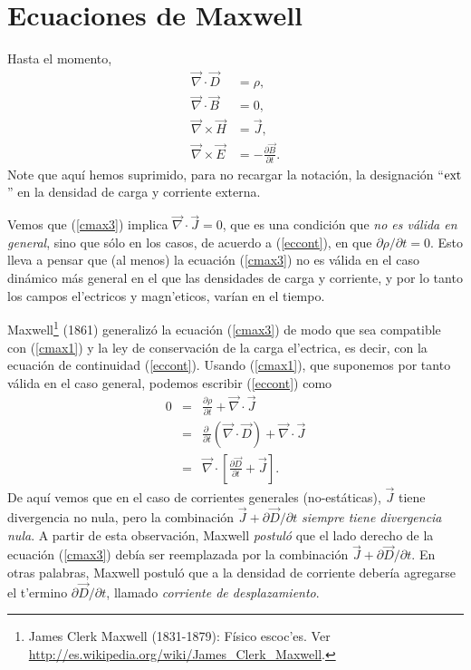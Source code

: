 \section{Ecuaciones de Maxwell}
Hasta el momento,
\begin{align}
\vec\nabla\cdot\vec{D} & =\rho ,\label{cmax1}\\
\vec\nabla\cdot\vec{B}  & =0 ,\label{cmax2}\\
\vec\nabla\times\vec{H}  & =\vec{J} ,\label{cmax3}\\
\vec\nabla\times\vec{E}  & =-\frac{\partial\vec{B}}{\partial t} .\label{cmax4}
\end{align}
Note que aquí hemos suprimido, para no recargar la notación, la designación ``${\rm ext}$'' en la densidad de carga y corriente externa.

Vemos que (\ref{cmax3}) implica $\vec\nabla\cdot\vec{J}=0$, que es una condición que \textit{no es válida en general}, sino que sólo en los casos, de acuerdo a (\ref{eccont}), en que ${\partial\rho}/{\partial t}=0$. Esto lleva a pensar que (al menos) la ecuación (\ref{cmax3}) no es válida en el caso dinámico más general en el que las densidades de carga y corriente, y por lo tanto los campos el'ectricos y magn'eticos, varían en el tiempo.

Maxwell\footnote{James Clerk Maxwell (1831-1879): Físico escoc'es. Ver \url{http://es.wikipedia.org/wiki/James_Clerk_Maxwell}.} (1861) generalizó la ecuación (\ref{cmax3}) de modo que sea compatible con (\ref{cmax1}) y la ley de conservación de la carga el'ectrica,
es decir, con la ecuación de continuidad (\ref{eccont}). Usando (\ref{cmax1}), que suponemos por tanto válida en el caso general, podemos escribir (\ref{eccont}) como
\begin{eqnarray}
 0&=&\frac{\partial\rho}{\partial t}+\vec{\nabla}\cdot\vec{J}\\
&=& \frac{\partial\ }{\partial
t}\left(\vec\nabla\cdot\vec{D}\right)+\vec{\nabla}\cdot\vec{J}\\
&=& \vec\nabla\cdot\left[\frac{\partial\vec{D}}{\partial t}
+\vec{J}\right].
\end{eqnarray}
De aquí vemos que en el caso de corrientes generales (no-estáticas), $\vec{J}$ tiene divergencia no nula, pero la combinación $\vec{J}+{\partial\vec{D}}/{\partial t}$ \textit{siempre tiene divergencia nula}. A partir de esta observación, Maxwell \textit{postuló} que el lado derecho de la ecuación (\ref{cmax3}) debía ser reemplazada por la combinación $\vec{J}+{\partial\vec{D}}/{\partial t}$. En otras palabras, Maxwell postuló que a la densidad de corriente debería agregarse el t'ermino ${\partial\vec{D}}/{\partial t}$, llamado \textit{corriente de desplazamiento}.

